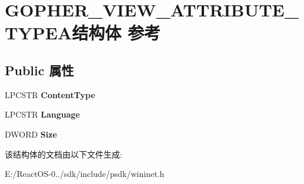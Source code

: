 \hypertarget{struct_g_o_p_h_e_r___v_i_e_w___a_t_t_r_i_b_u_t_e___t_y_p_e_a}{}\section{G\+O\+P\+H\+E\+R\+\_\+\+V\+I\+E\+W\+\_\+\+A\+T\+T\+R\+I\+B\+U\+T\+E\+\_\+\+T\+Y\+P\+E\+A结构体 参考}
\label{struct_g_o_p_h_e_r___v_i_e_w___a_t_t_r_i_b_u_t_e___t_y_p_e_a}
\subsection*{Public 属性}
\begin{DoxyCompactItemize}
\item 
\mbox{\label{struct_g_o_p_h_e_r___v_i_e_w___a_t_t_r_i_b_u_t_e___t_y_p_e_a_a2394551112aa51d1d3b5a9ada9549260}} 
L\+P\+C\+S\+TR {\bfseries Content\+Type}
\item 
\mbox{\label{struct_g_o_p_h_e_r___v_i_e_w___a_t_t_r_i_b_u_t_e___t_y_p_e_a_ae42fb95f01f9289e1006f407e5dc72af}} 
L\+P\+C\+S\+TR {\bfseries Language}
\item 
\mbox{\label{struct_g_o_p_h_e_r___v_i_e_w___a_t_t_r_i_b_u_t_e___t_y_p_e_a_a8393bd59b97afac158f9557350fbe43c}} 
D\+W\+O\+RD {\bfseries Size}
\end{DoxyCompactItemize}


该结构体的文档由以下文件生成\+:\begin{DoxyCompactItemize}
\item 
E\+:/\+React\+O\+S-\/0../sdk/include/psdk/wininet.\+h\end{DoxyCompactItemize}
